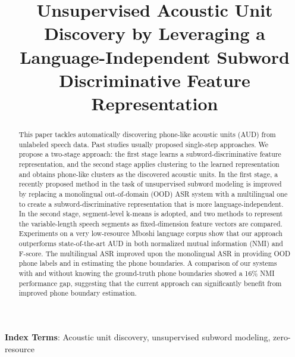 \documentclass[a4paper]{article}
\title{Unsupervised Acoustic Unit Discovery by Leveraging a Language-Independent Subword Discriminative Feature Representation}
\begin{document}
\maketitle
% 
\begin{abstract}
This paper tackles  automatically discovering  phone-like acoustic units (AUD) from unlabeled speech data. 
Past studies usually proposed single-step approaches.
We propose a two-stage approach: the first stage learns a subword-discriminative feature representation, and the second stage applies clustering to the learned representation and obtains phone-like clusters as the discovered acoustic units. In the first stage, a recently proposed  method in the task of unsupervised subword modeling is improved by replacing a monolingual out-of-domain (OOD) ASR system with a multilingual one to create a  subword-discriminative representation that is more language-independent. In the second stage, segment-level k-means is adopted, and two methods to represent the variable-length speech segments as fixed-dimension feature vectors are compared. Experiments on a very low-resource Mboshi language corpus   show that our approach outperforms state-of-the-art AUD in both normalized mutual information (NMI) and F-score. The multilingual ASR improved upon the monolingual ASR in providing OOD phone labels and in estimating the phone boundaries. 
A comparison of our systems with and without knowing the ground-truth phone boundaries showed a 16\% NMI performance gap, suggesting that 
the current approach can significantly benefit from improved phone boundary estimation.
 \end{abstract}
\noindent\textbf{Index Terms}:  
Acoustic unit discovery, unsupervised subword modeling, zero-resource
\end{document}
